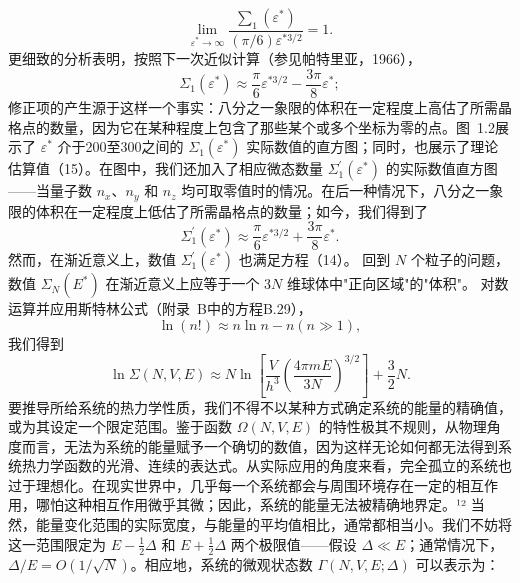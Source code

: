 \begin{equation}\tag{1.3.33}\label{eq:1.3.33}
\operatorname* { l i m } _ { \varepsilon ^{*} \to \infty } { \frac { \sum _ { 1 } ( \varepsilon ^{*} ) } { ( \pi / 6 ) \varepsilon ^{* 3 / 2} } } = 1 .
\end{equation}
更细致的分析表明，按照下一次近似计算（参见帕特里亚，1966），
\begin{equation}\tag{1.3.34}\label{eq:1.3.34}
\Sigma _ { 1 } ( \varepsilon ^{*} ) \approx \frac { \pi } { 6 } \varepsilon ^{* 3 / 2} - \frac { 3 \pi } { 8 } \varepsilon ^{*} ;
\end{equation}
修正项的产生源于这样一个事实：八分之一象限的体积在一定程度上高估了所需晶格点的数量，因为它在某种程度上包含了那些某个或多个坐标为零的点。图~1.2展示了 \(\varepsilon^{*}\) 介于200至300之间的 \(\Sigma_{1}(\varepsilon^{*})\) 实际数值的直方图；同时，也展示了理论估算值（15）。在图中，我们还加入了相应微态数量 \(\Sigma_{1}^{\prime}(\varepsilon^{*})\) 的实际数值直方图——当量子数 \(n_{x}\)、\(n_{y}\) 和 \(n_{z}\) 均可取零值时的情况。在后一种情况下，八分之一象限的体积在一定程度上低估了所需晶格点的数量；如今，我们得到了
\begin{equation}\tag{1.3.35}\label{eq:1.3.35}
\Sigma _ { 1 } ^{\prime} ( \varepsilon ^{*} ) \approx \frac { \pi } { 6 } \varepsilon ^{* 3 / 2} + \frac { 3 \pi } { 8 } \varepsilon ^{*} .
\end{equation}
然而，在渐近意义上，数值 \(\Sigma_{1}^{\prime}(\varepsilon^{*})\) 也满足方程（14）。
回到 \(N\) 个粒子的问题，数值 \(\Sigma_{N}(E^{*})\) 在渐近意义上应等于一个 \(3N\) 维球体中"正向区域"的"体积"。
对数运算并应用斯特林公式（附录~B中的方程B.29），
\begin{equation}\tag{1.3.36}\label{eq:1.3.36}
\ln ( n ! ) \approx n \ln n - n  ( n \gg 1 ) ,
\end{equation}
我们得到
\begin{equation}\tag{1.3.37}\label{eq:1.3.37}
\ln \Sigma ( N , V , E ) \approx N \ln \left[ \frac { V } { h ^{3} } \left( \frac { 4 \pi m E } { 3 N } \right) ^{3 / 2} \right] + \frac { 3 } { 2 } N .
\end{equation}
要推导所给系统的热力学性质，我们不得不以某种方式确定系统的能量的精确值，或为其设定一个限定范围。鉴于函数 \(\Omega(N,V,E)\) 的特性极其不规则，从物理角度而言，无法为系统的能量赋予一个确切的数值，因为这样无论如何都无法得到系统热力学函数的光滑、连续的表达式。从实际应用的角度来看，完全孤立的系统也过于理想化。在现实世界中，几乎每一个系统都会与周围环境存在一定的相互作用，哪怕这种相互作用微乎其微；因此，系统的能量无法被精确地界定。¹² 当然，能量变化范围的实际宽度，与能量的平均值相比，通常都相当小。我们不妨将这一范围限定为 \(E - \frac{1}{2}\Delta\) 和 \(E + \frac{1}{2}\Delta\) 两个极限值——假设 \(\Delta \ll E\)；通常情况下，\(\Delta/E = O(1/\sqrt{N})\)。相应地，系统的微观状态数 \(\Gamma(N,V,E;\Delta)\) 可以表示为：
